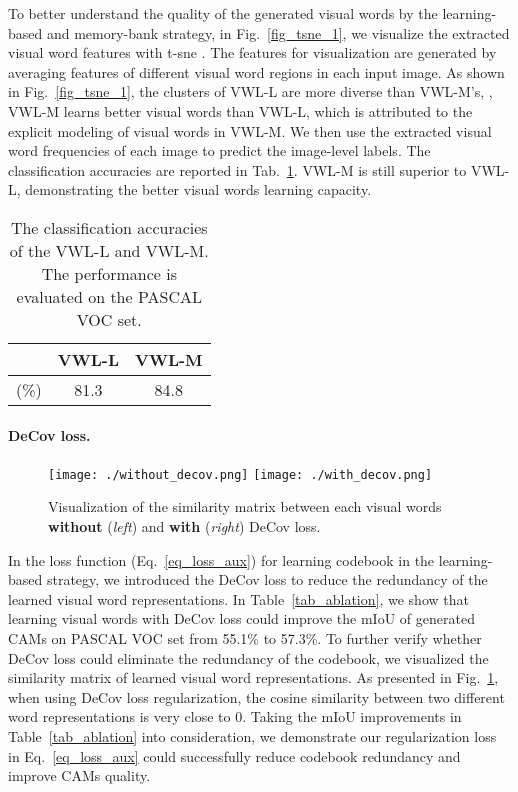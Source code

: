 \par To better understand the quality of the generated visual words by the learning-based and memory-bank strategy, in Fig.~\ref{fig_tsne_1}, we visualize the extracted visual word features with t-sne \citep{van2014accelerating}. The features for visualization are generated by averaging features of different visual word regions in each input image. As shown in Fig.~\ref{fig_tsne_1}, the clusters of VWL-L are more diverse than VWL-M's, \ie, VWL-M learns better visual words than VWL-L, which is attributed to the explicit modeling of visual words in VWL-M. We then use the extracted visual word frequencies of each image to predict the image-level labels. The classification accuracies are reported in Tab.~\ref{tab_word_freq_1}. VWL-M is still superior to VWL-L, demonstrating the better visual words learning capacity.

\begin{table}[h]

  \caption{The classification accuracies of the VWL-L and VWL-M. The performance is evaluated on the PASCAL VOC  set.}
  \label{tab_word_freq_1}
  \centering
  \begin{tabular}{r|cc}
    \toprule
               & VWL-L & VWL-M \\ \midrule
     (\%) & 81.3  & 84.8  \\ \bottomrule
  \end{tabular}
\end{table}

\paragraph{\textbf{DeCov loss.}}
\begin{figure}[htp]
  \centering
  \texttt{[image: ./without\_decov.png]}
  \texttt{[image: ./with\_decov.png]}
  \caption{Visualization of the similarity matrix between each visual words \textbf{without} (\textit{left}) and \textbf{with} (\textit{right}) DeCov loss.}
  \label{fig_vis_codebook}
\end{figure}

\par In the loss function (Eq.~\eqref{eq_loss_aux}) for learning codebook in the learning-based strategy, we introduced the DeCov loss \citep{cogswell2015reducing} to reduce the redundancy of the learned visual word representations. In Table~\ref{tab_ablation}, we show that learning visual words with DeCov loss could improve the mIoU of generated CAMs on PASCAL VOC  set from 55.1\% to 57.3\%. To further verify whether DeCov loss could eliminate the redundancy of the codebook, we visualized the similarity matrix of learned visual word representations. As presented in Fig.~\ref{fig_vis_codebook}, when using DeCov loss regularization, the cosine similarity between two different word representations is very close to 0. Taking the mIoU improvements in Table~\ref{tab_ablation} into consideration, we demonstrate our regularization loss in Eq.~\eqref{eq_loss_aux} could successfully reduce codebook redundancy and improve CAMs quality.

